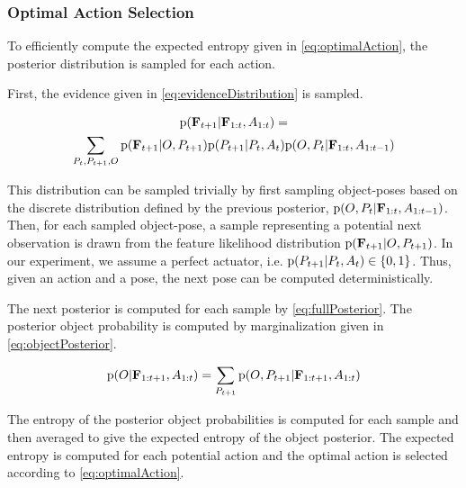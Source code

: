             \subsubsection{Optimal Action Selection}

                To efficiently compute the expected entropy given in \eqref{eq:optimalAction}, the posterior distribution is sampled for each action.%

                First, the evidence given in \eqref{eq:evidenceDistribution} is sampled.

                {\small
                \begin{multline}
                    \label{eq:evidenceDistribution}
                    \prob{\set{F}_{t+1}|\set{F}_{1:t}, A_{1:t}} = \\ \sum_{P_t,P_{t+1},O}  \prob{\set{F}_{t+1}|O,P_{t+1}} \prob{P_{t+1}|P_t,A_t} \prob{O,P_t|\set{F}_{1:t},A_{1:t-1}}
                \end{multline}
                }

%

                This distribution can be sampled trivially by first sampling object-poses based on the discrete distribution defined by the previous posterior, $\text{p}(O,P_t|\mathbf{F}_{1:t},A_{1:t-1})$. Then, for each sampled object-pose, a sample representing a potential next observation is drawn from the feature likelihood distribution $\text{p}(\mathbf{F}_{t+1}|O,P_{t+1})$. In our experiment, we assume a perfect actuator, i.e. $\text{p}(P_{t+1}|P_t,A_t) \in \{ 0 , 1 \}$. Thus, given an action and a pose, the next pose can be computed deterministically.

                The next posterior is computed for each sample by \eqref{eq:fullPosterior}. The posterior object probability is computed by marginalization given in \eqref{eq:objectPosterior}.

                \begin{equation}
                    \label{eq:objectPosterior}
                    \prob{O|\set{F}_{1:t+1},A_{1:t}} = \sum_{P_{t+1}} \prob{O,P_{t+1}|\set{F}_{1:t+1},A_{1:t}}
                \end{equation}

                The entropy of the posterior object probabilities is computed for each sample and then averaged to give the expected entropy of the object posterior. The expected entropy is computed for each potential action and the optimal action is selected according to \eqref{eq:optimalAction}.
